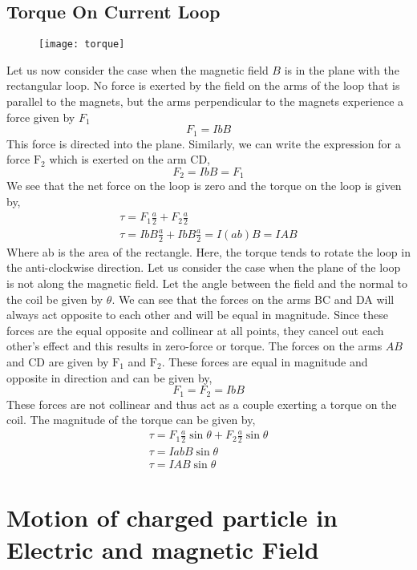 \subsection{Torque On Current Loop}
	\begin{figure}[H]
	\begin{center}
		\texttt{[image: torque]}
	\end{center}
\end{figure}
Let us now consider the case when the magnetic field $B$ is in the plane with the rectangular loop. No force is exerted by the field on the arms of the loop that is parallel to the magnets, but the arms perpendicular to the magnets experience a force given by $F_{1}$
$$
F_{1}=I b B
$$
This force is directed into the plane.
Similarly, we can write the expression for a force $\mathrm{F}_{2}$ which is exerted on the arm CD,
$$
F_{2}=I b B=F_{1}
$$
We see that the net force on the loop is zero and the torque on the loop is given by,
$$
\begin{gathered}
\tau=F_{1} \frac{a}{2}+F_{2} \frac{a}{2} \\
\tau=I b B \frac{a}{2}+I b B \frac{a}{2}=I(a b) B=I A B
\end{gathered}
$$
Where ab is the area of the rectangle. Here, the torque tends to rotate the loop in the anti-clockwise direction. Let us consider the case when the plane of the loop is not along the magnetic field. Let the angle between the field and the normal to the coil be given by $\theta$. We can see that the forces on the arms BC and DA will always act opposite to each other and will be equal in magnitude. Since these forces are the equal opposite and collinear at all points, they cancel out each other's effect and this results in zero-force or torque. The forces on the arms $A B$ and $\mathrm{CD}$ are given by $\mathrm{F}_{1}$ and $\mathrm{F}_{2}$. These forces are equal in magnitude and opposite in direction and can be given by,
$$
F_{1}=F_{2}=I b B
$$
These forces are not collinear and thus act as a couple exerting a torque on the coil. The magnitude of the torque can be given by,
$$
\begin{gathered}
\tau=F_{1} \frac{a}{2} \sin \theta+F_{2} \frac{a}{2} \sin \theta \\
\tau=I a b B \sin \theta \\
\tau=I A B \sin \theta
\end{gathered}
$$
\section{Motion of charged particle in Electric and magnetic Field}
